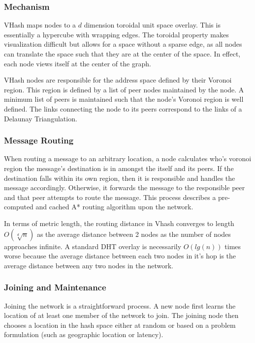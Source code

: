 \documentclass{article}
\begin{document}
\subsubsection*{Mechanism}
VHash maps nodes to a $d$ dimension toroidal unit space overlay. This is essentially a hypercube with wrapping edges. The toroidal property makes visualization difficult but allows for a space without a sparse edge, as all nodes can translate the space such that they are at the center of the space.  In effect, each node views itself at the center of the graph.

VHash nodes are responsible for the address space defined by their Voronoi region. This region is defined by a list of peer nodes maintained by the node. A minimum list of peers is maintained such that the node's Voronoi region is well defined. The links connecting the node to its peers correspond to the links of a Delaunay Triangulation.

\subsubsection*{Message Routing}
When routing a message to an arbitrary location, a node calculates who's voronoi region the message's destination is in amongst the itself and its peers. If the destination falls within its own region, then it is responsible and handles the message accordingly. Otherwise, it forwards the message to the responsible peer and that peer attempts to route the message. This process describes a pre-computed and cached A*\citep{astar} routing algorithm upon the network. 

In terms of metric length, the routing distance in Vhash converges to length $O(\sqrt[d]{n})$ as the average distance between 2 nodes as the number of nodes approaches infinite. A standard DHT overlay is necessarily $O(lg(n))$ times worse because the average distance between each two nodes in it's hop is the average distance between any two nodes in the network. 

\subsubsection*{Joining and Maintenance}
Joining the network is a straightforward process. A new node first learns the location of at least one member of the network to join. The joining node then chooses a location in the hash space either at random or based on a problem formulation (such as geographic location or latency).
\end{document}
